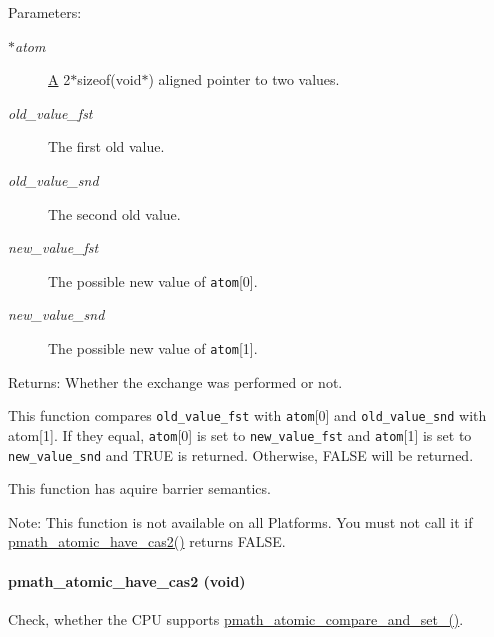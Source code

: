 \begin{Desc}
\item[Parameters:]
\begin{description}
\item[{\em $\ast$atom}]\hyperlink{class_a}{A} 2$\ast$sizeof(void$\ast$) aligned pointer to two values. \item[{\em old\_\-value\_\-fst}]The first old value. \item[{\em old\_\-value\_\-snd}]The second old value. \item[{\em new\_\-value\_\-fst}]The possible new value of {\tt atom}\mbox{[}0\mbox{]}. \item[{\em new\_\-value\_\-snd}]The possible new value of {\tt atom}\mbox{[}1\mbox{]}. \end{description}
\end{Desc}
\begin{Desc}
\item[Returns:]Whether the exchange was performed or not.\end{Desc}
This function compares {\tt old\_\-value\_\-fst} with {\tt atom}\mbox{[}0\mbox{]} and {\tt old\_\-value\_\-snd} with atom\mbox{[}1\mbox{]}. If they equal, {\tt atom}\mbox{[}0\mbox{]} is set to {\tt new\_\-value\_\-fst} and {\tt atom}\mbox{[}1\mbox{]} is set to {\tt new\_\-value\_\-snd} and TRUE is returned. Otherwise, FALSE will be returned.

This function has aquire barrier semantics.

\begin{Desc}
\item[Note:]This function is not available on all Platforms. You must not call it if \hyperlink{group__atomic__ops_g9bc606e66ad7965f09dc9200f0b21bcc}{pmath\_\-atomic\_\-have\_\-cas2()} returns FALSE. \end{Desc}
\hypertarget{group__atomic__ops_g9bc606e66ad7965f09dc9200f0b21bcc}{
\paragraph[{pmath\_\-atomic\_\-have\_\-cas2}]{ pmath\_\-atomic\_\-have\_\-cas2 (void)}\hfill}
\label{group__atomic__ops_g9bc606e66ad7965f09dc9200f0b21bcc}


Check, whether the CPU supports \hyperlink{group__atomic__ops_g868adc2a74d7aafbb0670922f61a21cc}{pmath\_\-atomic\_\-compare\_\-and\_\-set\_()}. 

